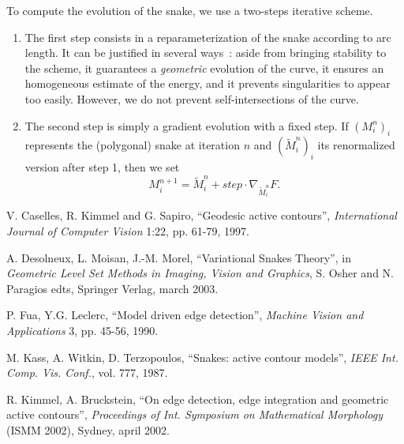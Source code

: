 \medskip

To compute the evolution of the snake, we use a two-steps iterative
scheme.
\begin{enumerate}
\item The first step consists in a reparameterization of the snake
according to arc length. It can be justified in several ways~:
aside from bringing stability to the scheme, it guarantees a {\it
geometric} evolution of the curve, it ensures an homogeneous
estimate of the energy, and it prevents singularities to appear
too easily. However, we do not prevent self-intersections of the
curve.
\item The second step is simply a gradient evolution with a fixed step.
If $(M_i^n)_i$ represents the (polygonal) snake at iteration $n$ and
$(\tilde M_i^n)_i$ its renormalized version after step 1, then we set
$$M_i^{n+1} = \tilde M_i^n + step \cdot  \nabla_{\tilde M_i^n} F.$$
\end{enumerate}

\begin{thebibliography}{1}

V. Caselles, R. Kimmel and G. Sapiro,
``Geodesic active contours'',
{\it International Journal of Computer Vision} 1:22, pp. 61-79, 1997.

A. Desolneux, L. Moisan, J.-M. Morel,
``Variational Snakes Theory'',
in {\it Geometric Level Set Methods in Imaging, Vision and Graphics}, 
S. Osher and N. Paragios edts, Springer Verlag, march 2003.

P. Fua, Y.G. Leclerc,
``Model driven edge detection'',
{\it Machine Vision and Applications} 3, pp. 45-56, 1990.

M. Kass, A. Witkin, D. Terzopoulos,
``Snakes: active contour models'',
{\it IEEE Int. Comp. Vis. Conf.}, vol. 777, 1987.

R. Kimmel, A. Bruckstein,
``On edge detection, edge integration and geometric active contours'',
{\it Proceedings of Int. Symposium on Mathematical Morphology} (ISMM 2002), 
Sydney, april 2002.

\end{thebibliography}


